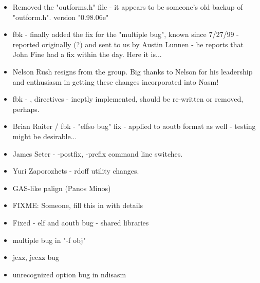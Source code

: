 
\begin{itemize}
    \item{Removed the "outforms.h" file - it appears to be
        someone's old backup of "outform.h". version "0.98.06e"}
    \item{fbk - finally added the fix for the "multiple  bug",
        known since 7/27/99 - reported originally (?) and sent to
        us by Austin Lunnen - he reports that John Fine had a fix
        within the day. Here it is...}
    \item{Nelson Rush resigns from the group. Big thanks to Nelson for
        his leadership and enthusiasm in getting these changes
        incorporated into Nasm!}
    \item{fbk - \code{[list +]}, \code{[list -]} directives - ineptly implemented,
        should be re-written or removed, perhaps.}
    \item{Brian Raiter / fbk - "elfso bug" fix - applied to aoutb format
        as well - testing might be desirable...}
    \item{James Seter - -postfix, -prefix command line switches.}
    \item{Yuri Zaporozhets - rdoff utility changes.}
\end{itemize}


\begin{itemize}
    \item{GAS-like palign (Panos Minos)}
    \item{FIXME: Someone, fill this in with details}
\end{itemize}


\begin{itemize}
    \item{Fixed - elf and aoutb bug - shared libraries}
    \item{multiple  bug in "-f obj"}
    \item{jcxz, jecxz bug}
    \item{unrecognized option bug in ndisasm}
\end{itemize}



